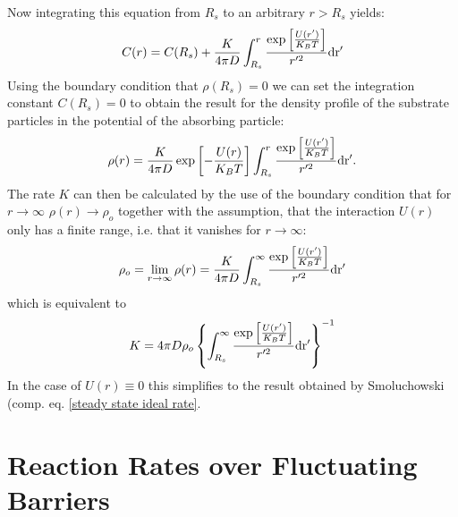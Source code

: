 Now integrating this equation from $R_s$ to an arbitrary $r>R_s$ yields:
\begin{equation}
    C(r) = C(R_s) + \frac{K}{4 \pi D}\int_{R_s}^{r} \frac{\exp \left[ \frac{U(r')}{K_B T}\right]}{r'^2} \rm d r'
    \label{solution_C(r)}
\end{equation}
Using the boundary condition that $\rho(R_s)=0$  we can set the integration constant $C(R_s) = 0$ to obtain the result for the density profile of the substrate particles in the potential of the absorbing particle:
\begin{equation}
    \rho(r) = \frac{K}{4 \pi D}\exp \left[ -\frac{U(r)}{K_B T} \right] \int_{R_s}^{r} \frac{\exp \left[ \frac{U(r')}{K_B T}\right]}{r'^2} \rm d r'.
    \label{rho_debye}
\end{equation}
The rate $K$ can then be calculated by the use of the boundary condition that for $r \rightarrow \infty$ $\rho(r) \rightarrow \rho_o$ together with the assumption, that the interaction $U(r)$ only has a finite range, i.e. that it vanishes for $r \rightarrow \infty$:
\begin{equation}
    \rho_o = \lim_{r\rightarrow \infty} \rho(r) = \frac{K}{4 \pi D}\int_{R_s}^{\infty} \frac{\exp \left[ \frac{U(r')}{K_B T}\right]}{r'^2} \rm d r'
    \label{lim_rho_debye_infty}
\end{equation}
which is equivalent to 
\begin{equation}
    K = 4 \pi D \rho_o \left\{\int_{R_s}^{\infty} \frac{\exp \left[ \frac{U(r')}{K_B T}\right]}{r'^2} \rm d r' \right\}^{-1}
    \label{K_Debye}
\end{equation}
In the case of $U(r) \equiv 0$ this simplifies to the result obtained by Smoluchowski (comp. eq. \eqref{steady state ideal rate}.

\section{Reaction Rates over Fluctuating Barriers}
